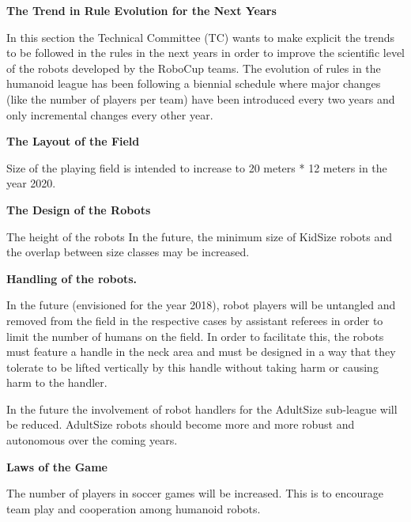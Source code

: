 \clearpage
\sffamily
{\bfseries\color[rgb]{0.4,0.4,0.4}
The Trend in Rule Evolution for the Next Years }

\bigskip

In this section the Technical Committee (TC) wants to make explicit the trends to be followed in the rules in the next years in order to improve the scientific level of the robots developed by the RoboCup teams. The evolution of rules in the humanoid league has been following
a biennial schedule where major changes (like the number of players per team) have been introduced every two years and only incremental changes every other year.

\bigskip

{\bfseries The Layout of the Field}

\headlinebox

Size of the playing field is intended to increase to 20 meters * 12 meters in the year 2020.

\bigskip

{\bfseries The Design of the Robots}

\headlinebox

The height of the robots In the future, the minimum size of KidSize robots and the overlap between size classes may be increased.

\bigskip

{\bfseries Handling of the robots.}

\headlinebox

In the future (envisioned for the year 2018), robot players will be untangled and removed from the field in the respective cases by assistant referees in order to limit the number of humans on the field. In order to facilitate this, the robots must feature a handle in the neck area and must be designed in a way that they tolerate to be lifted vertically by this handle without taking harm or causing harm to the handler.

\bigskip

In the future the involvement of robot handlers for the AdultSize sub-league will be reduced. AdultSize robots should become more and more robust and autonomous over the coming years.

\bigskip

{\bfseries Laws of the Game}

\headlinebox

The number of players in soccer games will be increased. This is to encourage team play and cooperation among humanoid robots.

